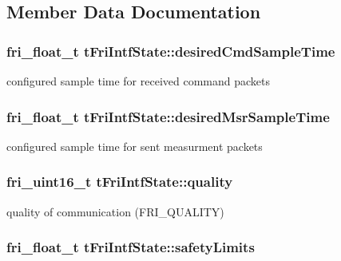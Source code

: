 \subsection{\-Member \-Data \-Documentation}
\hypertarget{structtFriIntfState_a47568e63ea7211bcd31141dfeb5f91ef}{
\subsubsection[{desired\-Cmd\-Sample\-Time}]{\setlength{\rightskip}{0pt plus 5cm}fri\-\_\-float\-\_\-t {\bf t\-Fri\-Intf\-State\-::desired\-Cmd\-Sample\-Time}}}\label{structtFriIntfState_a47568e63ea7211bcd31141dfeb5f91ef}
configured sample time for received command packets \hypertarget{structtFriIntfState_ae1520116a2c17e7d701786c0524508a3}{
\subsubsection[{desired\-Msr\-Sample\-Time}]{\setlength{\rightskip}{0pt plus 5cm}fri\-\_\-float\-\_\-t {\bf t\-Fri\-Intf\-State\-::desired\-Msr\-Sample\-Time}}}\label{structtFriIntfState_ae1520116a2c17e7d701786c0524508a3}
configured sample time for sent measurment packets \hypertarget{structtFriIntfState_acfb16eec860cf8908d6d6fc2009a7061}{
\subsubsection[{quality}]{\setlength{\rightskip}{0pt plus 5cm}fri\-\_\-uint16\-\_\-t {\bf t\-Fri\-Intf\-State\-::quality}}}\label{structtFriIntfState_acfb16eec860cf8908d6d6fc2009a7061}
quality of communication (\-F\-R\-I\-\_\-\-Q\-U\-A\-L\-I\-T\-Y) \hypertarget{structtFriIntfState_ad3172f366c6c805a5c196796de78eaa6}{
\subsubsection[{safety\-Limits}]{\setlength{\rightskip}{0pt plus 5cm}fri\-\_\-float\-\_\-t {\bf t\-Fri\-Intf\-State\-::safety\-Limits}}}\label{structtFriIntfState_ad3172f366c6c805a5c196796de78eaa6}
